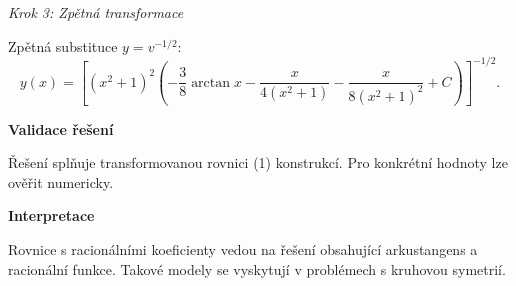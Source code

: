 \begin{example}
    \vspace{1\baselineskip}
    
    \noindent\textit{Krok 3: Zpětná transformace}
    
    Zpětná substituce $y = v^{-1/2}$:
    \[
    y(x) = \left[ (x^2 + 1)^2 \left( -\frac{3}{8}\arctan x - \frac{x}{4(x^2 + 1)} - \frac{x}{8(x^2 + 1)^2} + C \right) \right]^{-1/2}. \tag{3}
    \]
    
    \vspace{1.5\baselineskip}
    
    \noindent\textbf{Validace řešení}
    
    Řešení splňuje transformovanou rovnici (1) konstrukcí. Pro konkrétní hodnoty lze ověřit numericky.
    
    \vspace{1.5\baselineskip}
    
    \noindent\textbf{Interpretace}
    
    Rovnice s racionálními koeficienty vedou na řešení obsahující arkustangens a racionální funkce. Takové modely se vyskytují v problémech s kruhovou symetrií.
    
    \end{example}
    
    \vspace{2\baselineskip}
    
